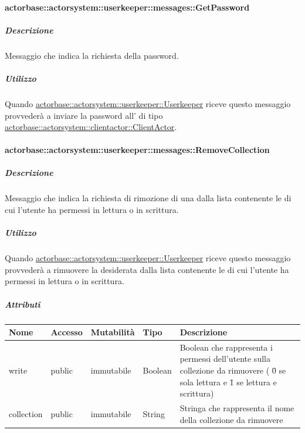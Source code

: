\documentclass{scalatekids-article}
\begin{document}
\paragraph{actorbase::actorsystem::userkeeper::messages::GetPassword}
\label{sec:actorbase::actorsystem::userkeeper::messages::GetPassword}

\subparagraph{Descrizione}

Messaggio che indica la richiesta della password.

\subparagraph{Utilizzo}

Quando \hyperref[sec:actorbase::actorsystem::userkeeper::Userkeeper]{actorbase::\allowbreak{}actorsystem::\allowbreak{}userkeeper::\allowbreak{}Userkeeper}
riceve questo messaggio provvederà a inviare la password all' di tipo
\hyperref[sec:actorbase::actorsystem::clientactor::ClientActor]{actorbase::\allowbreak{}actorsystem::\allowbreak{}clientactor::\allowbreak{}ClientActor}.

\paragraph{actorbase::actorsystem::userkeeper::messages::RemoveCollection}
\label{sec:actorbase::actorsystem::userkeeper::messages::RemoveCollection}

\subparagraph{Descrizione}

Messaggio che indica la richiesta di rimozione di una  dalla
lista contenente le  di cui l'utente ha permessi in lettura
o in scrittura.

\subparagraph{Utilizzo}

Quando \hyperref[sec:actorbase::actorsystem::userkeeper::Userkeeper]{actorbase::\allowbreak{}actorsystem::\allowbreak{}userkeeper::\allowbreak{}Userkeeper}
riceve questo messaggio provvederà a rimuovere la  desiderata
dalla lista contenente le  di cui l'utente ha permessi in
lettura o in scrittura.

\subparagraph{Attributi}
\begin{tabular}{| p{3cm} | p{1.5cm} | p{2cm} | p{2cm} | p{8.5cm} |}
  \hline
  Nome & Accesso & Mutabilità & Tipo & Descrizione\\
  \hline
  write & public & immutabile & Boolean & Boolean che rappresenta i permessi dell'utente sulla collezione da rimuovere ( \=0 se sola lettura e \=1 se lettura e scrittura) \\
  \hline
  collection & public & immutabile & String & Stringa che rappresenta il nome della collezione da rimuovere \\
  \hline
\end{tabular}
\end{document}
